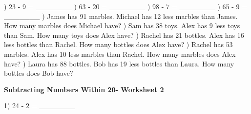 \documentclass{article}%
\begin{document}
\newline%
\newline%
) 23 {-} 9 = \_\_\_\_\_\_\_%
\newline%
\newline%
) 63 {-} 20 = \_\_\_\_\_\_\_%
\newline%
\newline%
) 98 {-} 7 = \_\_\_\_\_\_\_%
\newline%
\newline%
) 65 {-} 9 = \_\_\_\_\_\_\_%
\newline%
\newline%
) James has 91 marbles. Michael has 12 less marbles than James. How many marbles does Michael have?%
\newline%
\newline%
) Sam has 38 toys. Alex has 9 less toys than Sam. How many toys does Alex have?%
\newline%
\newline%
) Rachel has 21 bottles. Alex has 16 less bottles than Rachel. How many bottles does Alex have?%
\newline%
\newline%
) Rachel has 53 marbles. Alex has 10 less marbles than Rachel. How many marbles does Alex have?%
\newline%
\newline%
) Laura has 88 bottles. Bob has 19 less bottles than Laura. How many bottles does Bob have?%
\newline%
\newline%
\newline%
\pagebreak%
\large%
\begin{center}%
\textbf{Subtracting Numbers Within 20- Worksheet 2}%
\newline%
\newline%
\newline%
\end{center} \normalsize%
1) 24 {-} 2 = \_\_\_\_\_\_\_%
\newline%
\newline%
\newline%
\end{document}
